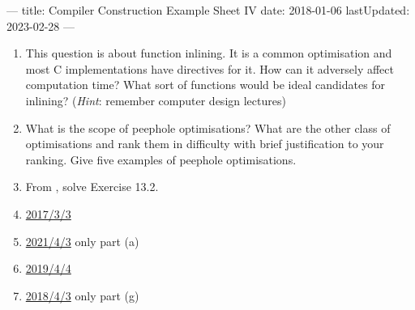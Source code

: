 ---
title: Compiler Construction Example Sheet IV
date: 2018-01-06
lastUpdated: 2023-02-28
---



\begin{enumerate}
  \item This question is about function inlining. It is a common optimisation
    and most \textsc{C} implementations have directives for it. How can it
    adversely affect computation time? What sort of functions would be ideal
    candidates for inlining? (\emph{Hint}: remember computer design lectures)

  \item What is the scope of peephole optimisations? What are the other class
    of optimisations and rank them in difficulty with brief justification to
    your ranking. Give five examples of peephole optimisations.

  \item From \citet[chap. 13]{mogensen}, solve Exercise 13.2.

  \item \href{http://www.cl.cam.ac.uk/teaching/exams/pastpapers/y2017p23q3.pdf}{2017/3/3}

  \item \href{https://www.cl.cam.ac.uk/teaching/exams/pastpapers/y2021p4q3.pdf}{2021/4/3} only part (a)

  \item \href{https://www.cl.cam.ac.uk/teaching/exams/pastpapers/y2019p4q4.pdf}{2019/4/4}

  \item \href{https://www.cl.cam.ac.uk/teaching/exams/pastpapers/y2018p4q3.pdf}{2018/4/3} only part (g)

\end{enumerate}


